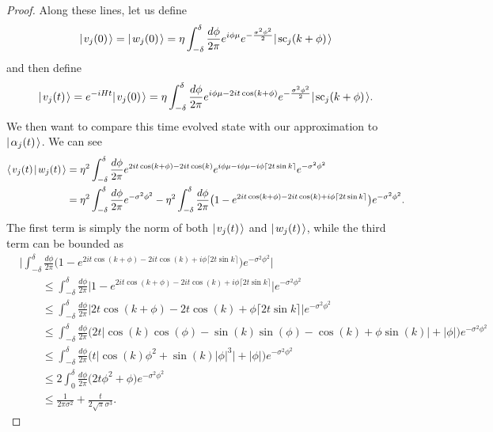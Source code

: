 \documentclass[../thesis-main/thesis-main]{subfiles}
\begin{document}
\begin{proof}
Along these lines, let us define
\begin{align}
  |\mspace{2mu} v_j(0) \mspace{2mu} \rangle = |\mspace{2mu} w_j(0) \mspace{2mu} \rangle = \eta \int_{-\delta}^\delta \frac{d\phi}{2\pi} e^{ i \phi \mu} e^{ - \frac{\sigma^2 \phi^2}{2}}|\mspace{2mu} \text{sc}_j(k+\phi) \mspace{2mu} \rangle
\end{align}
and then define 
\begin{align}
  |\mspace{2mu} v_j(t) \mspace{2mu} \rangle = e^{-i H t} |\mspace{2mu} v_j(0) \mspace{2mu} \rangle = \eta \int_{-\delta}^\delta \frac{d\phi}{2\pi} e^{ i \phi \mu - 2 i t \cos(k+\phi)} e^{ - \frac{\sigma^2 \phi^2}{2}} |\mspace{2mu} \text{sc}_j(k+\phi) \mspace{2mu} \rangle.
\end{align}
We then want to compare this time evolved state with our approximation to $|\mspace{2mu} \alpha_j(t) \mspace{2mu} \rangle$.  We can see 
\begin{align}
  \langle\mspace{2mu} v_j(t) \mspace{2mu} | \mspace{2mu} w_j(t)\mspace{2mu} \rangle &= \eta^2 \int_{-\delta}^\delta \frac{d\phi}{2\pi} e^{ 2i t \cos(k+\phi) - 2 i t \cos(k)} e^{ i \phi \mu - i \phi \mu - i \phi \lceil 2t \sin k\rceil} e^{-\sigma^2 \phi^2}\\
  &= \eta^2 \int_{-\delta}^\delta \frac{d\phi}{2\pi} e^{-\sigma^2\phi^2} - \eta^2 \int_{-\delta}^\delta \frac{d\phi}{2\pi}\big( 1 - e^{ 2i t \cos(k+\phi) - 2 i t \cos(k) +i \phi \lceil 2t \sin k\rceil} \big)e^{-\sigma^2\phi^2}.
\end{align}
The first term is simply the norm of both $|\mspace{2mu} v_j(t) \mspace{2mu} \rangle$ and $|\mspace{2mu} w_j(t) \mspace{2mu} \rangle$, while the third term can be bounded as
\begin{align}
 & \Bigg| \int_{-\delta}^\delta \frac{d\phi}{2\pi}\big( 1 - e^{ 2i t \cos(k+\phi) - 2 i t \cos(k) + i \phi \lceil 2t \sin k\rceil} \big)e^{-\sigma^2\phi^2}\Bigg| \\
 &\qquad\leq \int_{-\delta}^\delta \frac{d\phi}{2\pi}\big| 1 - e^{ 2i t \cos(k+\phi) - 2 i t \cos(k) + i \phi \lceil 2t \sin k\rceil} \big|e^{-\sigma^2\phi^2}\\
  &\qquad\leq \int_{-\delta}^\delta \frac{d\phi}{2\pi}\big|2 t \cos(k+\phi) - 2 t \cos(k) + \phi \lceil 2t \sin k\rceil \big|e^{-\sigma^2\phi^2}\\
  &\qquad\leq \int_{-\delta}^\delta \frac{d\phi}{2\pi} \Big(2t \big|\cos(k) \cos(\phi) - \sin(k)\sin(\phi) - \cos(k) + \phi\sin(k)\big|+|\phi|\Big)e^{-\sigma^2\phi^2}\\
  &\qquad\leq \int_{-\delta}^\delta \frac{d\phi}{2\pi} \Big( t \big| \cos(k) \phi^2 + \sin(k) |\phi|^3\big| + |\phi|\Big) e^{-\sigma^2\phi^2}\\
  &\qquad \leq 2 \int_{0}^\delta \frac{d \phi}{2\pi} \big( 2 t \phi^2 + \phi\big) e^{-\sigma^2\phi^2}\\
  & \qquad \leq \frac{1}{2\pi\sigma^2} + \frac{t}{2\sqrt{\pi} \sigma^3}.

\end{align}
\end{proof}
\end{document}
